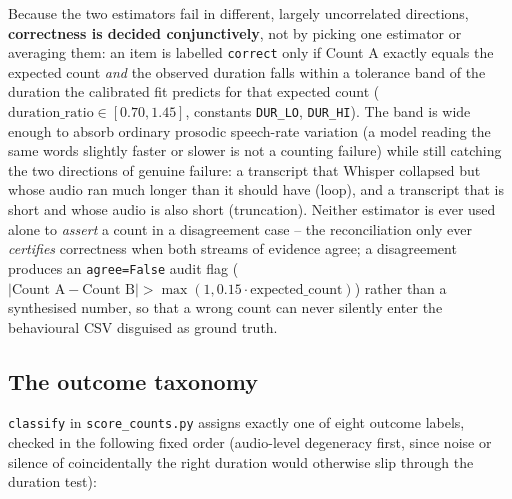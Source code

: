 \documentclass[11pt]{article}
\begin{document}
Because the two estimators fail in different, largely uncorrelated
directions, \textbf{correctness is decided conjunctively}, not by
picking one estimator or averaging them: an item is labelled \texttt{correct}
only if Count A exactly equals the expected count \emph{and} the observed
duration falls within a tolerance band of the duration the calibrated fit
predicts for that expected count
($\text{duration\_ratio} \in [0.70, 1.45]$, constants \texttt{DUR\_LO},
\texttt{DUR\_HI}). The band is wide enough to absorb ordinary prosodic
speech-rate variation (a model reading the same words slightly faster or
slower is not a counting failure) while still catching the two directions of
genuine failure: a transcript that Whisper collapsed but whose audio ran
much longer than it should have (loop), and a transcript that is short and
whose audio is also short (truncation). Neither estimator is ever used alone
to \emph{assert} a count in a disagreement case -- the reconciliation only
ever \emph{certifies} correctness when both streams of evidence agree; a
disagreement produces an \texttt{agree=False} audit flag
($|\text{Count A} - \text{Count B}| > \max(1, 0.15\cdot\text{expected\_count})$)
rather than a synthesised number, so that a wrong count can never silently
enter the behavioural CSV disguised as ground truth.

\subsection{The outcome taxonomy}

\texttt{classify} in \texttt{score\_counts.py} assigns exactly one of eight
outcome labels, checked in the following fixed order (audio-level degeneracy
first, since noise or silence of coincidentally the right duration would
otherwise slip through the duration test):
\end{document}
